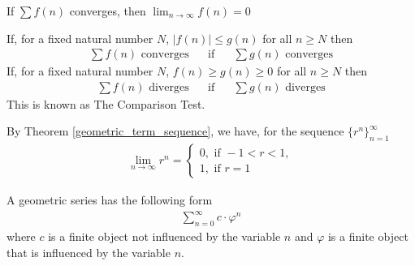 \begin{theorem}
If $\sum f(n)$ converges, then $\lim_{n \longrightarrow \infty} f(n) = 0$
\end{theorem}

\begin{theorem}
If, for a fixed natural number $N$, $\lvert f(n) \rvert \leq g(n)$ for all $n \geq N$ then
\begin{align*}
    \sum f(n) \hspace{4pt} \text{converges} \hspace{20pt} \text{if} \hspace{20pt} \sum g(n) \hspace{4pt} \text{converges}
\end{align*}
If, for a fixed natural number $N$, $f(n) \geq g(n) \geq 0$ for all $n \geq N$ then
\begin{align*}
    \sum f(n) \hspace{4pt} \text{diverges} \hspace{20pt} \text{if} \hspace{20pt} \sum g(n) \hspace{4pt} \text{diverges}
\end{align*}
This is known as The Comparison Test.
\end{theorem}

\begin{recall}
By Theorem \ref{geometric_term_sequence}, we have, for the sequence $\{r^{n}\}_{n=1}^{\infty}$
\begin{align*}
    \lim_{n \longrightarrow \infty} r^{n} = \begin{cases}
    0, \hspace{4pt} \text{if} \hspace{4pt} -1 < r < 1,\\[2ex]
    1, \hspace{4pt} \text{if} \hspace{4pt} r = 1
    \end{cases}
\end{align*}
\end{recall}

\begin{definition}
A geometric series has the following form
\begin{align*}
    \sum_{n = 0}^{\infty} c \cdot \varphi^{n}
\end{align*}
where $c$ is a finite object not influenced by the variable $n$ and $\varphi$ is a finite object that is influenced by the variable $n$. 
\end{definition}

